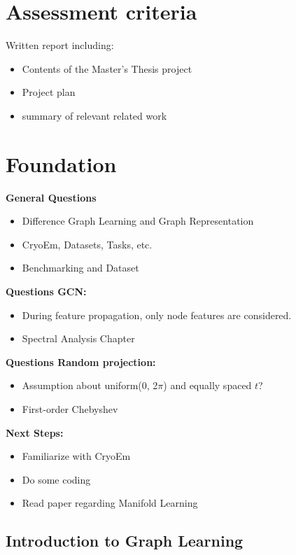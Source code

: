 \chapter{Assessment criteria}
Written report including: 
\begin{itemize}
    \item Contents of the Master's Thesis project
    \item Project plan
    \item summary of relevant related work
\end{itemize}

\chapter{Foundation}



\textbf{General Questions}
\begin{itemize}
    \item Difference Graph Learning and Graph Representation
    \item CryoEm, Datasets, Tasks, etc.
    \item Benchmarking and Dataset
\end{itemize}

\textbf{Questions GCN:}
\begin{itemize}
    \item During feature propagation, only node features are considered.
    \item Spectral Analysis Chapter
\end{itemize}


\textbf{Questions Random projection:}
\begin{itemize}
    \item Assumption about uniform(0, 2$\pi$) and equally spaced $t$?
    \item First-order Chebyshev
\end{itemize}

\textbf{Next Steps:}
\begin{itemize}
    \item Familiarize with CryoEm
    \item Do some coding
    \item Read paper regarding Manifold Learning
\end{itemize}

\section{Introduction to Graph Learning}

